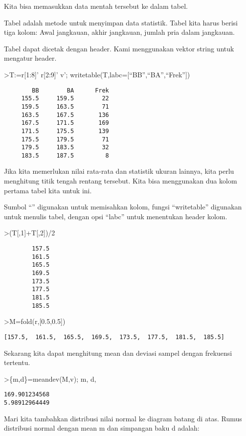\documentclass[
]{book}
\begin{document}
Kita bisa memasukkan data mentah tersebut ke dalam tabel.

Tabel adalah metode untuk menyimpan data statistik. Tabel kita harus berisi tiga kolom: Awal jangkauan, akhir jangkauan, jumlah pria dalam jangkauan.

Tabel dapat dicetak dengan header. Kami menggunakan vektor string untuk mengatur header.

\textgreater T:=r{[}1:8{]}' \textbar{} r{[}2:9{]}' \textbar{} v'; writetable(T,labc={[}``BB'',``BA'',``Frek''{]})

\begin{verbatim}
        BB        BA      Frek
     155.5     159.5        22
     159.5     163.5        71
     163.5     167.5       136
     167.5     171.5       169
     171.5     175.5       139
     175.5     179.5        71
     179.5     183.5        32
     183.5     187.5         8
\end{verbatim}

Jika kita memerlukan nilai rata-rata dan statistik ukuran lainnya, kita perlu menghitung titik tengah rentang tersebut. Kita bisa menggunakan dua kolom pertama tabel kita untuk ini.

Sumbol ``\textbar{}'' digunakan untuk memisahkan kolom, fungsi ``writetable'' digunakan untuk menulis tabel, dengan opsi ``labc'' untuk menentukan header kolom.

\textgreater(T{[},1{]}+T{[},2{]})/2

\begin{verbatim}
        157.5 
        161.5 
        165.5 
        169.5 
        173.5 
        177.5 
        181.5 
        185.5 
\end{verbatim}

\textgreater M=fold(r,{[}0.5,0.5{]})

\begin{verbatim}
[157.5,  161.5,  165.5,  169.5,  173.5,  177.5,  181.5,  185.5]
\end{verbatim}

Sekarang kita dapat menghitung mean dan deviasi sampel dengan frekuensi tertentu.

\textgreater\{m,d\}=meandev(M,v); m, d,

\begin{verbatim}
169.901234568
5.98912964449
\end{verbatim}

Mari kita tambahkan distribusi nilai normal ke diagram batang di atas. Rumus distribusi normal dengan mean m dan simpangan baku d adalah:
\end{document}
